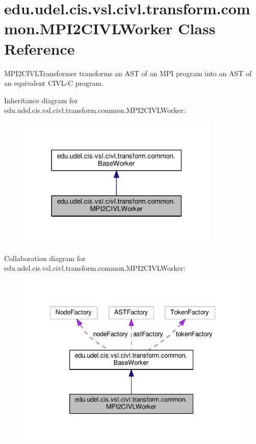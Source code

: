 \hypertarget{classedu_1_1udel_1_1cis_1_1vsl_1_1civl_1_1transform_1_1common_1_1MPI2CIVLWorker}{}\section{edu.\+udel.\+cis.\+vsl.\+civl.\+transform.\+common.\+M\+P\+I2\+C\+I\+V\+L\+Worker Class Reference}
\label{classedu_1_1udel_1_1cis_1_1vsl_1_1civl_1_1transform_1_1common_1_1MPI2CIVLWorker}


M\+P\+I2\+C\+I\+V\+L\+Transformer transforms an A\+S\+T of an M\+P\+I program into an A\+S\+T of an equivalent C\+I\+V\+L-\/\+C program.  




Inheritance diagram for edu.\+udel.\+cis.\+vsl.\+civl.\+transform.\+common.\+M\+P\+I2\+C\+I\+V\+L\+Worker\+:
\nopagebreak
\begin{figure}[H]
\begin{center}
\leavevmode
\includegraphics[width=271pt]{classedu_1_1udel_1_1cis_1_1vsl_1_1civl_1_1transform_1_1common_1_1MPI2CIVLWorker__inherit__graph}
\end{center}
\end{figure}


Collaboration diagram for edu.\+udel.\+cis.\+vsl.\+civl.\+transform.\+common.\+M\+P\+I2\+C\+I\+V\+L\+Worker\+:
\nopagebreak
\begin{figure}[H]
\begin{center}
\leavevmode
\includegraphics[width=335pt]{classedu_1_1udel_1_1cis_1_1vsl_1_1civl_1_1transform_1_1common_1_1MPI2CIVLWorker__coll__graph}
\end{center}
\end{figure}
